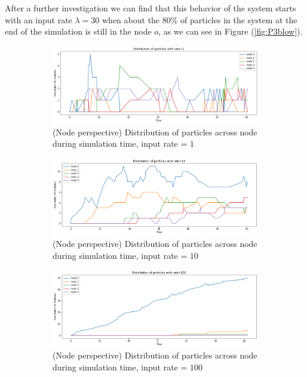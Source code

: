\documentclass[
	12pt, %
]{fphw}
\begin{document}
\begin{enumerate}[a)\normalfont]
    After a further investigation we can find that this behavior of the system starts with an input rate $\lambda = 30$ when about the $80\%$ of particles in the system at the end of the simulation is still in the node $o$, as we can see in Figure (\ref{fig:P3blow}).
    
    \begin{figure}
    \centering
        \begin{subfigure}{0.9\textwidth}
            \centering
            \includegraphics[width=1\linewidth]{P3b1.png}
            \caption{(Node perspective) Distribution of particles across node during simulation time, input rate = $1$}
            \label{fig:P3b1}
        \end{subfigure}
        \begin{subfigure}{0.9\textwidth}
            \centering
            \includegraphics[width=1\linewidth]{P3b2.png}
            \caption{(Node perspective) Distribution of particles across node during simulation time, input rate = $10$}
            \label{fig:P3b2}
        \end{subfigure}
        \begin{subfigure}{0.9\textwidth}
            \centering
            \includegraphics[width=1\linewidth]{P3b3.png}
            \caption{(Node perspective) Distribution of particles across node during simulation time, input rate = $100$}
            \label{fig:P3b3}
        \end{subfigure}
        \caption{}
        \label{fig:P3b}
    \end{figure}
    

\end{enumerate}
\end{document}
